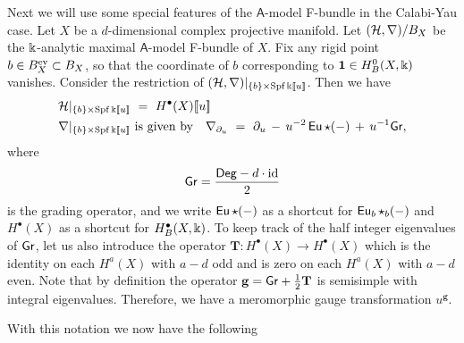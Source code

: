 \documentclass[twoside,leqno]{article}
\numberwithin{equation}{section}
\theoremstyle{plain}
\theoremstyle{definition}
\begin{document}
Next we will use some special features of the $\mathsf{A}$-model F-bundle in the Calabi-Yau case. Let $X$ be a $d$-dimensional complex projective manifold.
Let $(\mathcal H,\nabla)/B_{X}$ be the $\Bbbk$-analytic maximal $\mathsf{A}$-model F-bundle of $X$.
Fix any rigid point $b \in B_{X}^{\mathrm{ev}} \subset B_{X}$, so that the coordinate of $b$ corresponding to $\mathbf{1} \in H^0_{B}(X,\Bbbk)$ vanishes. Consider the restriction of
$(\mathcal H,\nabla)|_{\{b\}\times \operatorname{Spf} \Bbbk[\![u]\!]}$. Then we have
\[
\begin{aligned}
\mathcal H|_{\{b\}\times \operatorname{Spf} \Bbbk[\![u]\!]} \ & = \ H^{\bullet}(X)[\![u]\!] \\
\nabla|_{\{b\}\times \operatorname{Spf} \Bbbk[\![u]\!]} \ & \text{is given by} \quad \nabla_{\partial_{u}} \ = \ \partial_{u} \, - \, u^{-2}\operatorname{\mathsf{Eu}}\star (-) \, + \, u^{-1}\mathsf{Gr},
\end{aligned}
\]
where 
\[
\mathsf{Gr} = \frac{\mathsf{Deg} - d\cdot \operatorname{id}}{2}
\]
is the grading operator, and we write  $\operatorname{\mathsf{Eu}}\star (-)$ as a shortcut for 
$\operatorname{\mathsf{Eu}}_{b}\star_{b} (-)$ and $H^{\bullet}(X)$ as a shortcut for 
$H^{\bullet}_{B}(X,\Bbbk)$. To keep track of the half integer eigenvalues of $\mathsf{Gr}$, let us  also introduce the operator $\mathbf{T}   \colon H^{\bullet}(X) \to H^{\bullet}(X)$ which is the identity on each $H^{a}(X)$ with $a-d $ odd and is zero on each $H^{a}(X)$ with $a-d$ even. Note that by definition the operator $\mathbf{g} = \mathsf{Gr} + \frac{1}{2}\mathbf{T}$ is semisimple with integral eigenvalues. Therefore, we have a  meromorphic gauge transformation   $u^{\mathbf g}$.




With this notation we now have the following
\end{document}
